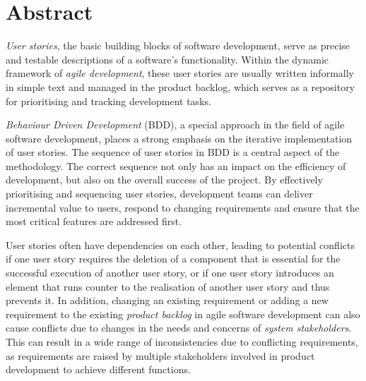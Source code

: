 \newpage
\section*{ Abstract}
\emph{User stories}, the basic building blocks of software development, serve as precise and testable descriptions of a software's functionality. Within the dynamic framework of \emph{agile development}, these user stories are usually written informally in simple text and managed in the product backlog, which serves as a repository for prioritising and tracking development tasks.

\emph{Behaviour Driven Development} (BDD), a special approach in the field of agile software development, places a strong emphasis on the iterative implementation of user stories. The sequence of user stories in BDD is a central aspect of the methodology. The correct sequence not only has an impact on the efficiency of development, but also on the overall success of the project. By effectively prioritising and sequencing user stories, development teams can deliver incremental value to users, respond to changing requirements and ensure that the most critical features are addressed first.

User stories often have dependencies on each other, leading to potential conflicts if one user story requires the deletion of a component that is essential for the successful execution of another user story, or if one user story introduces an element that runs counter to the realisation of another user story and thus prevents it. In addition, changing an existing requirement or adding a new requirement to the existing \emph{product backlog} in agile software development can also cause conflicts due to changes in the needs and concerns of \emph{system stakeholders}. This can result in a wide range of inconsistencies due to conflicting requirements, as requirements are raised by multiple stakeholders involved in product development to achieve different functions.

